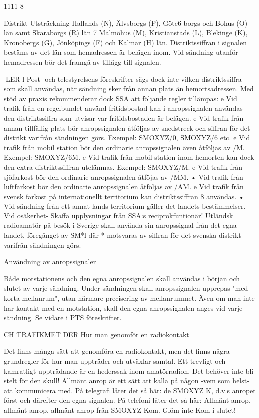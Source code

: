 \documentclass[a4paper,twoside,twocolumn,openright]{book}
\begin{document}
{{{{{1111-8

Distrikt Utsträckning
Hallands (N), Älvsborgs (P), Göte6
borgs och Bohus (O) län samt Skaraborgs (R) län
7
Malmöhus (M), Kristianstads (L),
Blekinge (K), Kronobergs (G),
Jönköpings (F) och Kalmar (H) län.
Distriktssiffran i signalen bestäms av det
län som hemadressen är belägen inom. Vid
sändning utanför hemadressen bör det
framgå av tillägg till signalen.

LER
l Post- och telestyrelsens föreskrifter sägs
dock inte vilken distriktssiffra som skall användas, när sändning sker från annan plats
än hemortsadressen.
Med stöd av praxis rekommenderar dock
SSA att följande regler tillämpas:
e
Vid trafik från en regelbundet använd
fritidsbostad kan i anropssignalen användas den distriktssiffra som utvisar var
fritidsbostaden är belägen.
e
Vid trafik från annan tillfällig plats bör
anropssignalen åtföljas av snedstreck och
siffran för det distrikt varifrån sändningen
görs.
Exempel: SMOXYZ/0, SMOXYZ/6 etc.
e
Vid trafik från mobil station bör den ordinarie anropssignalen även åtföljas av /M.
Exempel: SMOXYZ/6M.
e
Vid trafik från mobil station inom hemorten kan dock den extra distriktssiffran
utelämnas.
Exempel: SMOXYZ/M.
e
Vid trafik från sjöfarkost bör den ordinarie
anropssignalen åtföjas av /MM.
• Vid trafik från luftfarkost bör den ordinarie
anropssignalen åtföljas av /AM.
e
Vid trafik från svensk farkost på internationellt territorium kan distriktssiffran 8
användas.
• Vid sändning från ett annat lands territorium gäller det landets bestämmelser.
Vid osäkerhet- Skaffa upplysningar från
SSA:s reciprokfuntionär!
Utländsk radioamatör på besök i Sverige
skall använda sin anropssignal från det egna
landet, föregånget av SM*l där * motsvaras
av siffran för det svenska distrikt varifrån
sändningen görs.

Användning av anropssignaler

Både motstationens och den egna anropssignalen skall användas i början och slutet
av varje sändning.
Under sändningen skall anropssignalen
upprepas "med korta mellanrum", utan närmare precisering av mellanrummet.
Även om man inte har kontakt med en
motstation, skall den egna anropssignalen
anges vid varje sändning.
Se vidare i PTS föreskrifter.

CH TRAFIKMET DER
Hur man genomför en radiokontakt

Det finns många sätt att genomföra en radiokontakt, men det finns några grundregler för
hur man uppträder och utväxlar samtal. Ett
trevligt och kamratligt uppträdande är en
hederssak inom amatörradion. Det behöver
inte bli stelt för den skull!
Allmänt anrop är ett sätt att kalla på någon
-vem som helst- att kommunicera med.
På telegrafi låter det så här:
de SMOXYZ K, d.v.s anropet
först och därefter den egna signalen.
På telefoni låter det så här:
Allmänt anrop, allmänt anrop, allmänt anrop
från SMOXYZ Kom. Glöm inte Kom i slutet!

}}}}}
\end{document}
